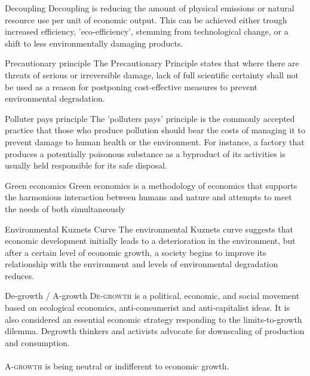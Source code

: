 \begin{sortEnvironment}{Decoupling}
Decoupling is reducing the amount of physical emissions or natural resource use per unit of economic output. This can be achieved either trough increased efficiency, 'eco-efficiency', stemming from technological change, or a shift to less environmentally damaging products. 
\end{sortEnvironment}

\begin{sortEnvironment}{Precautionary principle}
The Precautionary Principle states that where there are threats of serious or irreversible damage, lack of full scientific certainty shall not be used as a reason for postponing cost-effective measures to prevent environmental degradation.
\end{sortEnvironment}

\begin{sortEnvironment}{Polluter pays principle}
The 'polluters pays' principle is the commonly accepted practice that those who produce pollution should bear the costs of managing it to prevent damage to human health or the environment. For instance, a factory that produces a potentially poisonous substance as a byproduct of its activities is usually held responsible for its safe disposal. 
\end{sortEnvironment}

\begin{sortEnvironment}{Green economics}
Green economics is a methodology of economics that supports the harmonious interaction between humans and nature and attempts to meet the needs of both simultaneously
\end{sortEnvironment}

\begin{sortEnvironment}{Environmental Kuznets Curve}
The environmental Kuznets curve suggests that economic development initially leads to a deterioration in the environment, but after a certain level of economic growth, a society begins to improve its relationship with the environment and levels of environmental degradation reduces.
\end{sortEnvironment}

\begin{sortEnvironment}{De-growth / A-growth}
\textsc{De-growth} is a political, economic, and social movement based on ecological economics, anti-consumerist and anti-capitalist ideas. It is also considered an essential economic strategy responding to the limits-to-growth dilemma. Degrowth thinkers and activists advocate for downscaling of production and consumption. \\
\\
\textsc{A-growth} is being neutral or indifferent to economic growth. 
\end{sortEnvironment}

